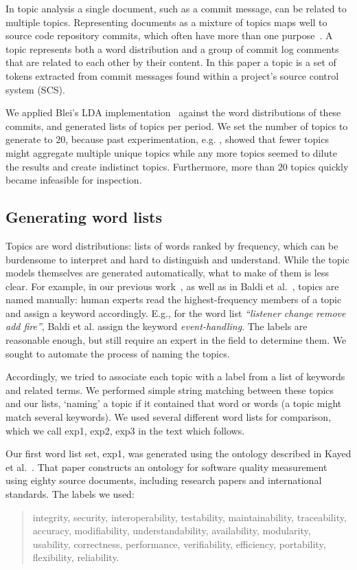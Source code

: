 \documentclass[]{sig-alternate}
\begin{document}
In topic analysis a single document, such as a commit message, can be related to multiple topics. Representing documents as a mixture of topics maps well to source code repository commits, which often have more than one purpose~\cite{Hindle09ICSM}.  A topic represents both a word distribution and a group of commit log comments that are related to each other by their content.  In this paper a topic is a set of tokens extracted from commit messages found within a project's source control system (SCS).

We applied Blei's LDA implementation~\cite{Blei2003} against the word distributions of these commits, and generated lists of topics per period. 
We set the number of topics to generate to $20$, because past experimentation, e.g. \cite{Hindle09ICSM}, showed that fewer topics might aggregate multiple unique topics while any more topics seemed to dilute the results and create indistinct topics. Furthermore, more than $20$ topics quickly became infeasible for inspection.

\subsection{Generating word lists}
Topics are word distributions: lists of words ranked by frequency, which can be burdensome to interpret and hard to distinguish and understand. While the topic models themselves are generated automatically, what to make of them is less clear. For example, in our previous work~\cite{Hindle09ICSM}, as well as in Baldi et al.~\cite{Baldi2008}, topics are named manually: human experts read the highest-frequency members of a topic and assign a keyword accordingly. E.g., for the word list \emph{``listener change remove add fire''}, Baldi et al. assign the keyword \emph{event-handling}. The labels are reasonable enough, but still require an expert in the field to determine them. We sought to automate the process of naming the topics.

Accordingly, we tried to associate each topic with a label from a list of keywords and related terms. We performed simple string matching between these topics and our lists, `naming' a topic if it contained that word or words (a topic might match several keywords). We used several different word lists for comparison, which we call \textsf{exp1, exp2, exp3} in the text which follows. 

Our first word list set, \textsf{exp1}, was generated using the ontology described in Kayed et al.~\cite{5072519}. That paper constructs an ontology for software quality measurement using eighty source documents, including research papers and international standards. The labels we used:
\begin{quotation}
\small \noindent \textsf{
integrity, security,
interoperability, testability, maintainability, traceability,
accuracy, modifiability, understandability, availability, modularity,
usability, correctness, performance, verifiability, efficiency,
portability, flexibility, reliability.
}
\end{quotation}
\end{document}
